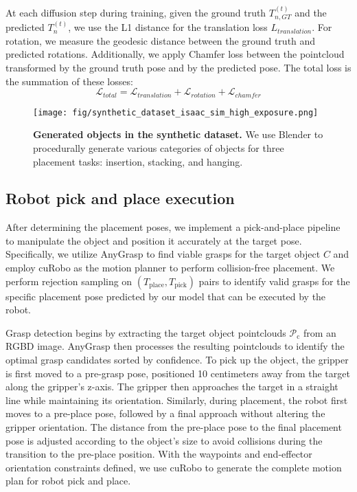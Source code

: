 At each diffusion step during training, given the ground truth \({T}_{n, GT}^{(t)} \) and the predicted \({T}_{n}^{(t)} \), we use the L1 distance for the translation loss $L_{translation}$. For rotation, we measure the geodesic distance between the ground truth and predicted rotations. Additionally, we apply Chamfer loss between the pointcloud transformed by the ground truth pose and by the predicted pose. The total loss is the summation of these losses: 
%
\begin{equation}
    \mathcal{L}_{total}= \mathcal{L}_{translation} + \mathcal{L}_{rotation}  + \mathcal{L}_{chamfer}
\end{equation}



\begin{figure}[t]
    \centering
    \texttt{[image: fig/synthetic\_dataset\_isaac\_sim\_high\_exposure.png]}
    \caption{\textbf{ Generated objects in the synthetic dataset.} We use Blender to procedurally generate various categories of objects for three placement tasks: insertion, stacking, and hanging.
    }
    \label{fig:dataset}
\end{figure}


\subsection{Robot pick and place execution}
\label{subsec:placement_pipeline}
After determining the placement poses, we implement a pick-and-place pipeline to manipulate the object and position it accurately at the target pose. Specifically, we utilize AnyGrasp \cite{fang2023anygrasp} to find viable grasps for the target object \(C\) and employ cuRobo \cite{curobo_report23} as the motion planner to perform collision-free placement. We perform rejection sampling on $(T_{\text{place}}, T_{\text{pick}})$ pairs to identify valid grasps for the specific placement pose predicted by our model that can be executed by the robot.

Grasp detection begins by extracting the target object pointclouds \( \mathcal{P}_{\text{c}} \) from an RGBD image. AnyGrasp \cite{fang2023anygrasp} then processes the resulting pointclouds to identify the optimal grasp candidates sorted by confidence. To pick up the object, the gripper is first moved to a pre-grasp pose, positioned 10 centimeters away from the target along the gripper's z-axis. The gripper then approaches the target in a straight line while maintaining its orientation. Similarly, during placement, the robot first moves to a pre-place pose, followed by a final approach without altering the gripper orientation. The distance from the pre-place pose to the final placement pose is adjusted according to the object's size to avoid collisions during the transition to the pre-place position. With the waypoints and end-effector orientation constraints defined, we use cuRobo to generate the complete motion plan for robot pick and place.  



